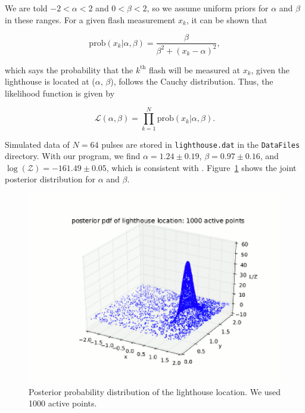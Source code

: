 \documentclass{article}
\def\mrm{\mathrm}
\begin{document}
 \vspace{0.2cm}
 
\noindent We are told $-2 < \alpha < 2$ and $0 < \beta < 2$, so we assume uniform priors for $\alpha$ and $\beta$ in these ranges. For a given flash measurement $x_k$, it can be shown that 

\begin{equation*}
\mrm{prob}(x_k | \alpha, \beta) = \frac{\beta}{\beta^2 + (x_k - \alpha)^2},
\end{equation*}

\noindent which says the probability that the $k^\mrm{th}$ flash will be measured at $x_k$, given the lighthouse is located at ($\alpha$, $\beta$), follows the Cauchy distribution. Thus, the likelihood function is given by

\begin{equation*}
\mathcal{L}(\alpha, \beta) = \prod_{k=1}^N \mrm{prob}(x_k | \alpha, \beta).
\end{equation*}

\noindent Simulated data of $N=64$ pulses are stored in {\tt lighthouse.dat} in the {\tt DataFiles} directory. With our program, we find $\alpha = 1.24 \pm 0.19$, $\beta = 0.97 \pm 0.16$, and $\log(\mathcal{Z}) =  -161.49 \pm 0.05$, which is consistent with \cite{Siv2006}. Figure~\ref{lighthouse} shows the joint posterior distribution for $\alpha$ and $\beta$. 

\begin{figure}[h]
\begin{center}
\includegraphics[width=12.0cm,trim=0cm 0cm 0cm 0cm,clip=true]{figures/lighthouse_s.eps}
\caption{Posterior probability distribution of the lighthouse location. We used 1000 active points.}
\label{lighthouse}
\end{center}
\end{figure}
\end{document}
